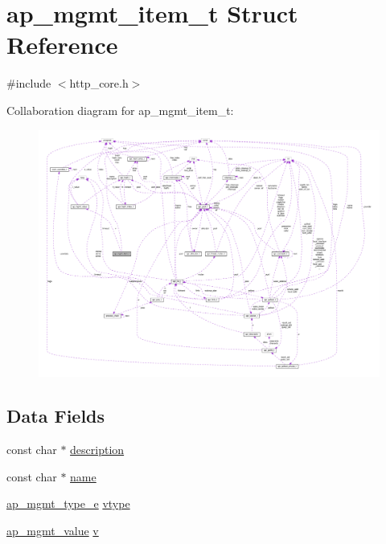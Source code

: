 \hypertarget{structap__mgmt__item__t}{}\section{ap\+\_\+mgmt\+\_\+item\+\_\+t Struct Reference}
\label{structap__mgmt__item__t}


{\ttfamily \#include $<$http\+\_\+core.\+h$>$}



Collaboration diagram for ap\+\_\+mgmt\+\_\+item\+\_\+t\+:
\nopagebreak
\begin{figure}[H]
\begin{center}
\leavevmode
\includegraphics[width=350pt]{structap__mgmt__item__t__coll__graph}
\end{center}
\end{figure}
\subsection*{Data Fields}
\begin{DoxyCompactItemize}
\item 
const char $\ast$ \hyperlink{structap__mgmt__item__t_a298008bcfb6ee60a252fbb4f916fa4cc}{description}
\item 
const char $\ast$ \hyperlink{structap__mgmt__item__t_ad6ebf778be5cfaf43afe5bfd62182c81}{name}
\item 
\hyperlink{group__APACHE__CORE__HTTPD_gaaf55dd27b182eda12b11c0694f78aae7}{ap\+\_\+mgmt\+\_\+type\+\_\+e} \hyperlink{structap__mgmt__item__t_a760264518b956dc378e2a197cd3e283f}{vtype}
\item 
\hyperlink{unionap__mgmt__value}{ap\+\_\+mgmt\+\_\+value} \hyperlink{structap__mgmt__item__t_a2a4c07aba533200ed529d57e8e7d69d7}{v}
\end{DoxyCompactItemize}


